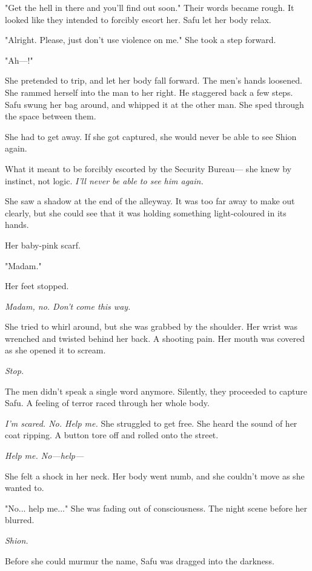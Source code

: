 "Get the hell in there and you'll find out soon." Their words became
rough. It looked like they intended to forcibly escort her. Safu let her
body relax.

"Alright. Please, just don't use violence on me." She took a step
forward.

"Ah---!"

She pretended to trip, and let her body fall forward. The men's hands
loosened. She rammed herself into the man to her right. He staggered
back a few steps. Safu swung her bag around, and whipped it at the other
man. She sped through the space between them.

She had to get away. If she got captured, she would never be able to see
Shion again.

What it meant to be forcibly escorted by the Security Bureau--- she knew
by instinct, not logic. \emph{I'll never be able to see him again.}

She saw a shadow at the end of the alleyway. It was too far away to make
out clearly, but she could see that it was holding something
light-coloured in its hands.

Her baby-pink scarf.

"Madam."

Her feet stopped.

\emph{Madam, no. Don't come this way.}

She tried to whirl around, but she was grabbed by the shoulder. Her
wrist was wrenched and twisted behind her back. A shooting pain. Her
mouth was covered as she opened it to scream.

\emph{Stop.}

The men didn't speak a single word anymore. Silently, they proceeded to
capture Safu. A feeling of terror raced through her whole body.

\emph{I'm scared. No. Help me.} She struggled to get free. She heard the sound
of her coat ripping. A button tore off and rolled onto the street.

\emph{Help me. No---help---}

She felt a shock in her neck. Her body went numb, and she couldn't move
as she wanted to.

"No... help me..." She was fading out of consciousness. The night scene
before her blurred.

\emph{Shion.}

Before she could murmur the name, Safu was dragged into the darkness.

\myspace

